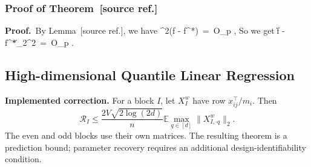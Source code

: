 \documentclass[twoside,11pt]{article}
\makeatletter
\newcommand{\implementedchange}[1]{%
  \par\smallskip\noindent
  {\color{revisionred}\textbf{Implemented correction.} #1}%
  \par\smallskip}
\newcommand{\discardlabel}[1]{}
\newcommand{\discardtwo}[2]{}
\newcommand{\legacyref}[1]{\textup{[source ref.]}}
\newcommand{\legacyeqref}[1]{\textup{[source equation]}}
\newenvironment{legacycomparison}{%
  \begingroup\color{legacygray}%
  \let\label\discardlabel
  \let\originallabel\discardlabel
  \let\ref\legacyref
  \let\pageref\legacyref
  \let\eqref\legacyeqref
  \let\cref\legacyref
  \let\Cref\legacyref
  \let\autoref\legacyref
  \let\aliasref\discardtwo
}{\endgroup}
\newcommand{\aliasref}[2]{%
  \@ifundefined{r@#2}{}{%
    \expandafter\let\csname r@#1\expandafter\endcsname\csname r@#2\endcsname}}
\makeatother
\begin{document}
\begin{legacycomparison}
\subsubsection{Proof of Theorem~\ref{Theorem_2}}
\par\medskip\noindent\textbf{Proof.}\ 
By Lemma~\ref{lem_tv_k}, we have 
\bea
\Delta^2(\hat f - f^*) \,=\, O_p , 
\bea   
So we get 
\bea 
\left\|\hat f - f^*\right\|_2^2 \,=\, O_p .
\bea  











\subsection{High-dimensional Quantile Linear Regression}

\implementedchange{For a block $I$, let $X_I^w$ have row $x_{ij}^{\top}/m_i$. Then
\[
\mathcal R_I\le\frac{2V\sqrt{2\log(2d)}}{n}
\mathbb E\max_{q\in[d]}\|X^w_{I,\cdot q}\|_2.
\]
The even and odd blocks use their own matrices. The resulting theorem is a prediction bound; parameter recovery requires an additional design-identifiability condition.}


\end{legacycomparison}
\end{document}
